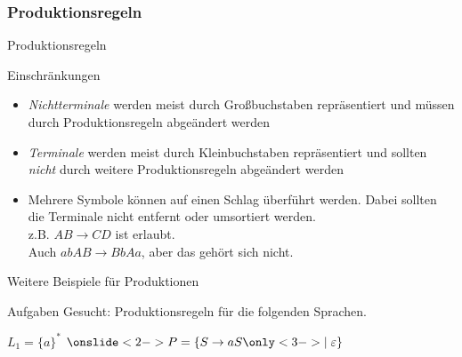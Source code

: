 \subsubsection{Produktionsregeln}
\begin{frame}{Produktionsregeln}
    \begin{alertblock}{Einschränkungen}
    \begin{itemize}
        \item \alert{\emph{Nichtterminale}} werden meist durch Großbuchstaben repräsentiert und müssen durch Produktionsregeln abgeändert werden
        \item \alert{\emph{Terminale}} werden meist durch Kleinbuchstaben repräsentiert und sollten \emph{nicht} durch weitere Produktionsregeln abgeändert werden
        \item Mehrere Symbole können auf einen Schlag überführt werden. Dabei sollten die Terminale nicht entfernt oder umsortiert werden.\\
        z.B. $AB \rightarrow CD$ ist erlaubt.\\
        Auch $abAB \rightarrow BbAa$, aber das gehört sich nicht.
    \end{itemize}
    \end{alertblock}
\end{frame}

\begin{frame}{Weitere Beispiele für Produktionen}
    \begin{alertblock}{Aufgaben}
    Gesucht: Produktionsregeln für die folgenden Sprachen.
    \end{alertblock}
    \begin{exampleblock}{$L_1 = \{a\}^*$}
    $\onslide<2->{P=\{S \rightarrow aS \only<3->{\mid \emptyWord}\}}$
    \end{exampleblock}
\end{frame}

